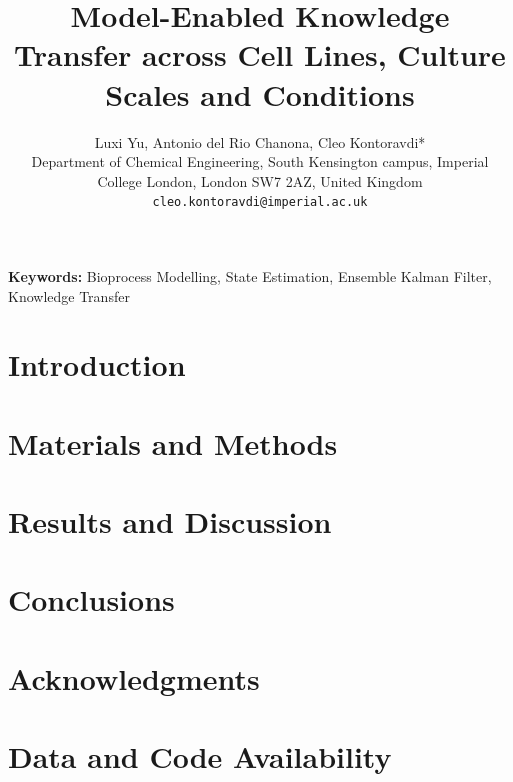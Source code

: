 \documentclass[10pt]{article}
\title{Model-Enabled Knowledge Transfer across Cell Lines, Culture Scales and Conditions}
\author{Luxi Yu, Antonio del Rio Chanona, Cleo Kontoravdi*\\
\small Department of Chemical Engineering, South Kensington campus, Imperial College London, London SW7 2AZ, United Kingdom\\
\small \texttt{cleo.kontoravdi@imperial.ac.uk}}
\newcommand{\rev}[1]{{\fontfamily{ptm}\selectfont\color{blue}#1}}
\begin{document}
\date{}

\maketitle

\begin{abstract}

\end{abstract}

\textbf{Keywords:}  Bioprocess Modelling, State Estimation, Ensemble Kalman Filter, Knowledge Transfer

\section{Introduction}


\section{Materials and Methods}


\section{Results and Discussion}


\section{Conclusions}


\section{Acknowledgments}


\section{\rev{Data and Code Availability}}


\clearpage



\newpage
\appendix

\renewcommand{\thefigure}{S\arabic{figure}}
\setcounter{figure}{0}

\renewcommand{\thetable}{S\arabic{table}}
\setcounter{table}{0}
\end{document}
